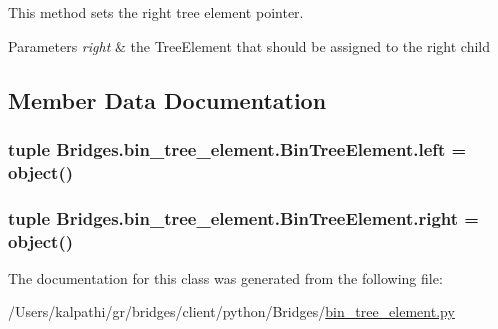 This method sets the right tree element pointer. 


\begin{DoxyParams}{Parameters}
{\em right} & the Tree\+Element that should be assigned to the right child \\
\hline
\end{DoxyParams}


\subsection{Member Data Documentation}
\hypertarget{class_bridges_1_1bin__tree__element_1_1_bin_tree_element_ae71553e3888615cdeb6fd8487045653c}{}
\subsubsection[{left}]{\setlength{\rightskip}{0pt plus 5cm}tuple Bridges.\+bin\+\_\+tree\+\_\+element.\+Bin\+Tree\+Element.\+left = object()\hspace{0.3cm}{\ttfamily [static]}}\label{class_bridges_1_1bin__tree__element_1_1_bin_tree_element_ae71553e3888615cdeb6fd8487045653c}
\hypertarget{class_bridges_1_1bin__tree__element_1_1_bin_tree_element_acae42ce2d77e073ea539893c86103c17}{}
\subsubsection[{right}]{\setlength{\rightskip}{0pt plus 5cm}tuple Bridges.\+bin\+\_\+tree\+\_\+element.\+Bin\+Tree\+Element.\+right = object()\hspace{0.3cm}{\ttfamily [static]}}\label{class_bridges_1_1bin__tree__element_1_1_bin_tree_element_acae42ce2d77e073ea539893c86103c17}


The documentation for this class was generated from the following file\+:\begin{DoxyCompactItemize}
\item 
/\+Users/kalpathi/gr/bridges/client/python/\+Bridges/\hyperlink{bin__tree__element_8py}{bin\+\_\+tree\+\_\+element.\+py}\end{DoxyCompactItemize}
